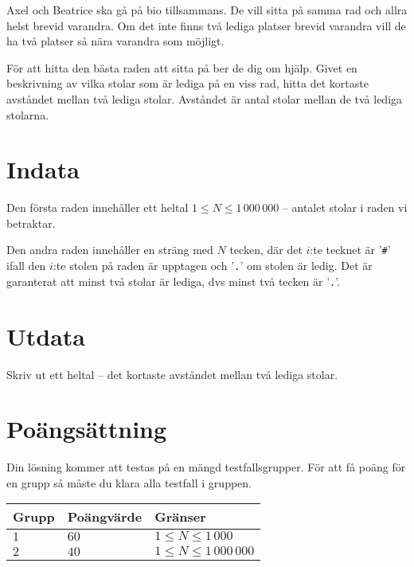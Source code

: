 
Axel och Beatrice ska gå på bio tillsammans.
De vill sitta på samma rad och allra helst brevid varandra.
Om det inte finns två lediga platser brevid varandra vill de ha två platser så nära varandra som möjligt.

För att hitta den bästa raden att sitta på ber de dig om hjälp.
Givet en beskrivning av vilka stolar som är lediga på en viss rad,
hitta det kortaste avståndet mellan två lediga stolar. Avståndet är antal stolar mellan de två lediga stolarna.


\section*{Indata}
Den första raden innehåller ett heltal $1 \le N \le 1\,000\,000$ -- antalet stolar i raden vi betraktar.

Den andra raden innehåller en sträng med $N$ tecken,
där det $i$:te tecknet är '\texttt{\#}' ifall den $i$:te stolen på raden är upptagen och '\texttt{.}' om stolen är ledig.
Det är garanterat att minst två stolar är lediga, dvs minst två tecken är '\texttt{.}'.

\section*{Utdata}
Skriv ut ett heltal -- det kortaste avståndet mellan två lediga stolar.

\section*{Poängsättning}
Din lösning kommer att testas på en mängd testfallsgrupper.
För att få poäng för en grupp så måste du klara alla testfall i gruppen.

\noindent
\begin{tabular}{| l | l | l |}
  \hline
  Grupp & Poängvärde & Gränser \\ \hline
  $1$    & $60$        &  $1 \le N \le 1\,000$ \\ \hline 
  $2$    & $40$        &  $1 \le N \le 1\,000\,000$ \\ \hline
\end{tabular}


